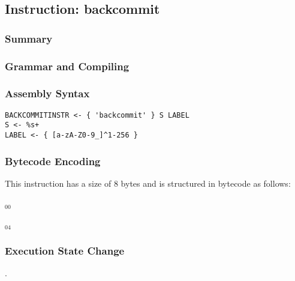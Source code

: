 \subsection{Instruction: backcommit}

\subsubsection{Summary}


\subsubsection{Grammar and Compiling}


\subsubsection{Assembly Syntax}

\begin{myquote}
\begin{verbatim}
BACKCOMMITINSTR <- { 'backcommit' } S LABEL
S <- %s+
LABEL <- { [a-zA-Z0-9_]^1-256 }
\end{verbatim}
\end{myquote}

\subsubsection{Bytecode Encoding}

This instruction has a size of 8 bytes and is structured in bytecode as follows:

$_{00}$\ 



$_{04}$\ 


\subsubsection{Execution State Change}

.


